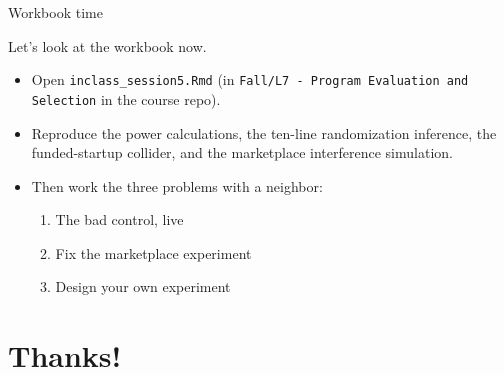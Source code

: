 \documentclass[aspectratio=169,11pt]{beamer}
\begin{document}
\begin{frame}{Workbook time}
\begin{center}
{\LARGE \alert{Let's look at the workbook now.}}
\end{center}
\bigskip
\begin{itemize}
	\item Open \texttt{inclass\_session5.Rmd} (in \texttt{Fall/L7 - Program Evaluation and Selection} in the course repo).
	\item Reproduce the power calculations, the ten-line randomization inference, the funded-startup collider, and the marketplace interference simulation.
	\item Then work the three problems with a neighbor:
	\begin{enumerate}
		\item The bad control, live
		\item Fix the marketplace experiment
		\item Design your own experiment
	\end{enumerate}
\end{itemize}
\end{frame}


\section{Thanks!}
\end{document}
